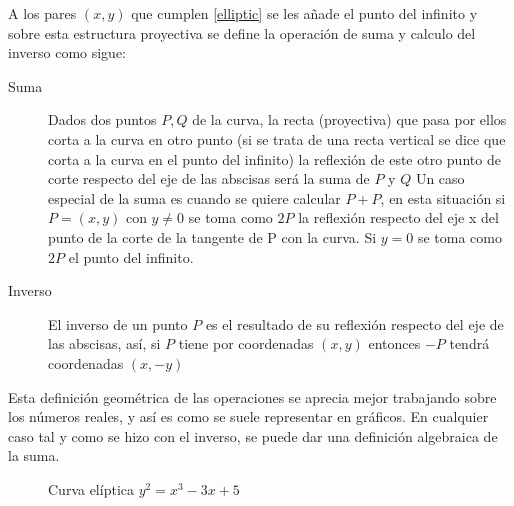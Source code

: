 A los pares $(x,y)$ que cumplen \ref{elliptic} se les añade el punto del infinito y sobre esta estructura proyectiva se define la operación de suma y calculo del inverso como sigue:
\begin{description}
\item [Suma]
Dados dos puntos $P, Q$ de la curva, la recta (proyectiva) que pasa por ellos corta a la curva en otro punto (si se trata de una recta vertical se dice que corta a la curva en el punto del infinito) la reflexión de este otro punto de corte respecto del eje de las abscisas será la suma de $P$ y $Q$
Un caso especial de la suma es cuando se quiere calcular $P+P$, en esta situación si $P =(x,y)$ con $y \not= 0$ se toma como $2P$ la reflexión respecto del eje x del punto de la corte de la tangente de P con la curva. Si $y = 0$ se toma como $2P$ el punto del infinito.
\item [Inverso]
 El inverso de un punto $P$ es el resultado de su reflexión respecto del eje de las abscisas, así, si $P$ tiene por coordenadas $(x,y)$ entonces $-P$ tendrá coordenadas $(x,-y)$
\end{description}%
Esta definición geométrica de las operaciones se aprecia mejor trabajando sobre los números reales, y así es como se suele representar en gráficos. En cualquier caso tal y como se hizo con el inverso, se puede dar una definición algebraica de la suma.

\begin{figure}[H]
  \qquad
	\caption{Curva elíptica $y^2 = x^3 -3x + 5$}%
	\label{fig:test}%
\end{figure}


